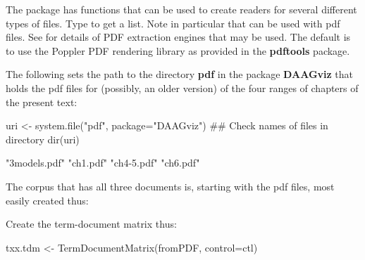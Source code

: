 The  package has functions that can be used to create readers
for several different types of files.  Type  to get
a list.  Note in particular  that can be used with pdf
files.  See  for details of PDF extraction
engines that may be used.  The default is to use the Poppler PDF
rendering library as provided in the {\bf pdftools} package.

The following sets the path to the directory {\bf pdf} in the 
package {\bf DAAGviz} that holds the pdf files for (possibly,
an older version) of the four ranges of chapters of the present
text:
\begin{Schunk}
\begin{Sinput}
uri <- system.file("pdf", package="DAAGviz")
## Check names of files in directory
dir(uri)
\end{Sinput}
\begin{Soutput}
[1] "3models.pdf" "ch1.pdf"     "ch4-5.pdf"   "ch6.pdf"    
\end{Soutput}
\end{Schunk}

The corpus that has all three documents is, starting with the
pdf files, most easily created thus:
\begin{fullwidth}
\begin{Schunk}
\end{Schunk}
\end{fullwidth}

Create the term-document matrix thus:
\begin{Schunk}
\begin{Sinput}
txx.tdm <- TermDocumentMatrix(fromPDF, control=ctl)
\end{Sinput}
\end{Schunk}

